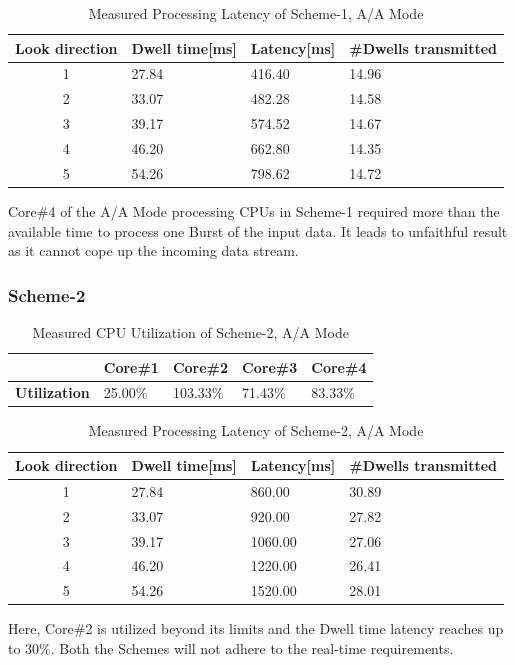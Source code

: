 \begin{table}[h!]
	\centering
	\begin{tabular}{|c|l|l|l|} 
	 \hline
	 \textbf{Look direction} & \textbf{Dwell time[ms]} & \textbf{Latency[ms]} & \textbf{\#Dwells transmitted} \\
	 \hline
	 1 & 27.84 & 416.40 & 14.96 \\ \hline
	 2 & 33.07 & 482.28 & 14.58 \\ \hline
	 3 & 39.17 & 574.52 & 14.67 \\ \hline
	 4 & 46.20 & 662.80 & 14.35 \\ \hline
	 5 & 54.26 & 798.62 & 14.72 \\ \hline
	\end{tabular}
	\caption{Measured Processing Latency of Scheme-1, A/A Mode}
	\label{tbl:mm:scheme1_true_latency}
\end{table}
Core\#4 of the A/A Mode processing CPUs in Scheme-1 required more than the available time to process one Burst of the input data. It leads to unfaithful result as it cannot cope up the incoming data stream.
\FloatBarrier

\subsubsection{Scheme-2}
\begin{table}[h!]
	\centering
	\begin{tabular}{|l|l|l|l|l|} 
	 \hline
	& \textbf{Core\#1} & \textbf{Core\#2} & \textbf{Core\#3} & \textbf{Core\#4} \\ \hline
	\textbf{Utilization} & 25.00\% & {\color{red} 103.33\%} & 71.43\% & 83.33\% \\ \hline
	\end{tabular}
	\caption{Measured CPU Utilization of Scheme-2, A/A Mode}
	\label{tbl:mm:scheme2_true_util}
\end{table}

\begin{table}[h!]
	\centering
	\begin{tabular}{|c|l|l|l|} 
	 \hline
	 \textbf{Look direction} & \textbf{Dwell time[ms]} & \textbf{Latency[ms]} & \textbf{\#Dwells transmitted} \\
	 \hline
	 1 & 27.84 & 860.00 & 30.89 \\ \hline
	 2 & 33.07 & 920.00 & 27.82 \\ \hline
	 3 & 39.17 & 1060.00 & 27.06 \\ \hline
	 4 & 46.20 & 1220.00 & 26.41 \\ \hline
	 5 & 54.26 & 1520.00 & 28.01 \\ \hline
	\end{tabular}
	\caption{Measured Processing Latency of Scheme-2, A/A Mode}
	\label{tbl:mm:scheme2_true_latency}
\end{table}
\FloatBarrier
Here, Core\#2 is utilized beyond its limits and the Dwell time latency reaches up to 30\%. Both the Schemes will not adhere to the real-time requirements.


